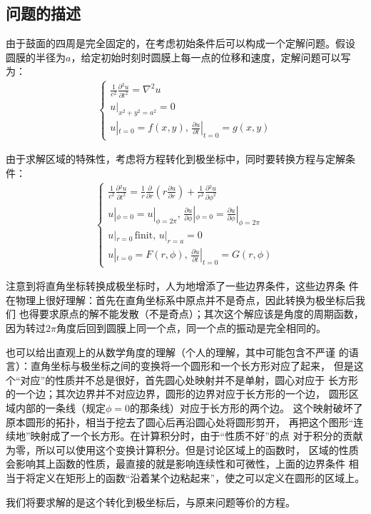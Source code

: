 \documentclass[a4paper]{ctexart}
\newcommand{\mr}[1]{\mathrm{#1}}
\newcommand{\pdv}[2]{\frac{\partial{#1}}{\partial{#2}}}
\begin{document}
	\subsection{问题的描述}
	由于鼓面的四周是完全固定的，在考虑初始条件后可以构成一个定解问题。假设
	圆膜的半径为$a$，给定初始时刻时圆膜上每一点的位移和速度，定解问题可以写为：
	\begin{align}
		\left\{
			\begin{array}{lr}
				\frac{1}{c^2}\pdv{^{2}u}{t^2} = \nabla^{2}u\\
				u|_{x^2 + y^2 = a^2} = 0\\
				u|_{t=0} = f(x, y),\, \pdv{u}{t}|_{t=0} = g(x, y)
			\end{array}
		\right.
	\end{align}
	\par 由于求解区域的特殊性，考虑将方程转化到极坐标中，同时要转换方程与定解条件：
	\begin{align}
		\left\{
			\begin{array}{lr}
				\frac{1}{c^2}\pdv{^{2}u}{t^2} = \frac{1}{r}\pdv{}{r}\left(r\pdv{u}{r}\right) + \frac{1}{r^2}\pdv{^2 u}{\phi^{2}}\\
				u|_{\phi=0} = u|_{\phi=2\pi},\, \pdv{u}{\phi}|_{\phi=0} = \pdv{u}{\phi}|_{\phi=2\pi}\\
				u|_{r=0}\,\mr{finit},\, u|_{r=a}=0\\
				u|_{t=0} = F(r, \phi),\, \pdv{u}{t}|_{t=0} = G(r, \phi)
			\end{array}
		\right.
	\end{align}
	\par 注意到将直角坐标转换成极坐标时，人为地增添了一些边界条件，这些边界条
	件在物理上很好理解：首先在直角坐标系中原点并不是奇点，因此转换为极坐标后我们
	也得要求原点的解不能发散（不是奇点）；其次这个解应该是角度的周期函数，
	因为转过$2\pi$角度后回到圆膜上同一个点，同一个点的振动是完全相同的。
	\par 也可以给出直观上的从数学角度的理解（个人的理解，其中可能包含不严谨
	的语言）：直角坐标与极坐标之间的变换将一个圆形和一个长方形对应了起来，
	但是这个“对应”的性质并不总是很好，首先圆心处映射并不是单射，圆心对应于
	长方形的一个边；其次边界并不对应边界，圆形的边界对应于长方形的一个边，
	圆形区域内部的一条线（规定$\phi=0$的那条线）对应于长方形的两个边。
	这个映射破坏了原本圆形的拓扑，相当于挖去了圆心后再沿圆心处将圆形剪开，
	再把这个图形“连续地”映射成了一个长方形。在计算积分时，由于“性质不好”的点
	对于积分的贡献为零，所以可以使用这个变换计算积分。但是讨论区域上的函数时，
	区域的性质会影响其上函数的性质，最直接的就是影响连续性和可微性，上面的边界条件
	相当于将定义在矩形上的函数“沿着某个边粘起来”，使之可以定义在圆形的区域上。
	\par 我们将要求解的是这个转化到极坐标后，与原来问题等价的方程。
\end{document}

